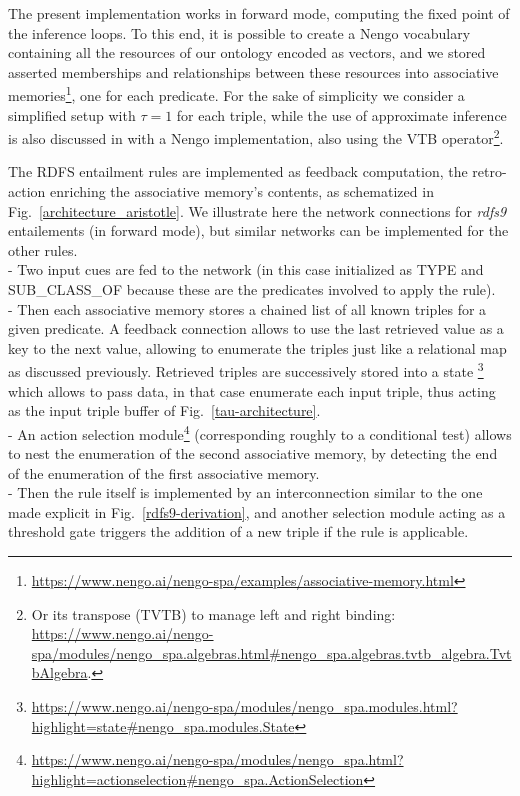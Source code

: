 \documentclass[sn-mathphys]{sn-jnl}
\begin{document}
The present implementation works in forward mode, computing the fixed point of the inference loops. To this end, it is possible to create a Nengo vocabulary containing all the resources of our ontology encoded as vectors, and we stored asserted memberships and relationships between these resources into associative memories\footnote{\url{https://www.nengo.ai/nengo-spa/examples/associative-memory.html}}, one for each predicate. For the sake of simplicity we consider a simplified setup with $\tau = 1$ for each triple, while the use of approximate inference is also discussed in \cite{mercier_ontology_2021} with a Nengo implementation, also using the VTB operator\footnote{Or its transpose (TVTB) to manage left and right binding: \url{https://www.nengo.ai/nengo-spa/modules/nengo_spa.algebras.html\#nengo_spa.algebras.tvtb_algebra.TvtbAlgebra}.}.

The RDFS entailment rules are implemented as feedback computation, the retro-action enriching the associative memory's contents, as schematized in Fig.~\ref{architecture_aristotle}. We illustrate here the network connections for \textit{rdfs9} entailements (in forward mode), but similar networks can be implemented for the other rules. 
\\- Two input cues are fed to the network (in this case initialized as TYPE and SUB\_CLASS\_OF because these are the predicates involved to apply the rule). 
\\- Then each associative memory stores a chained list of all known triples for a given predicate. A feedback connection allows to use the last retrieved value as a key to the next value, allowing to enumerate the triples just like a relational map as discussed previously. Retrieved triples are successively stored into a state \footnote{\url{https://www.nengo.ai/nengo-spa/modules/nengo_spa.modules.html?highlight=state\#nengo_spa.modules.State}} which allows to pass data, in that case enumerate each input triple, thus acting as the input triple buffer of Fig.~\ref{tau-architecture}.
\\ - An action selection module\footnote{\url{https://www.nengo.ai/nengo-spa/modules/nengo_spa.html?highlight=actionselection\#nengo_spa.ActionSelection}} (corresponding roughly to a conditional test) allows to nest the enumeration of the second associative memory, by detecting the end of the enumeration of the first associative memory.
\\ - Then the rule itself is implemented by an interconnection similar to the one made explicit in Fig.~\ref{rdfs9-derivation}, and another selection module acting as a threshold gate triggers the addition of a new triple if the rule is applicable.
\end{document}
